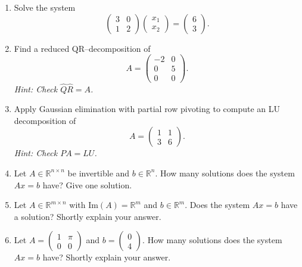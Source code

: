 \vspace*{-0.5cm}
\begin{enumerate}
	
	\item Solve the system
	$$\begin{pmatrix}
	3 & 0\\
	1 & 2
	\end{pmatrix}\begin{pmatrix}
	x_1 \\ x_2
	\end{pmatrix} = \begin{pmatrix}
	6 \\ 3
	\end{pmatrix}.  $$
	\item Find a reduced QR--decomposition of 
		$$A = \begin{pmatrix}
	-2 & 0\\
	0 & 5 \\
	0 & 0
	\end{pmatrix} .$$
	\textit{Hint: Check $\widehat{Q}\widehat{R} = A$.}
	\item Apply Gaussian elimination with partial row pivoting to compute an LU decomposition of 
	$$A = \begin{pmatrix}
	1 & 1\\
	3 & 6
	\end{pmatrix} .$$
	\textit{Hint: Check $PA=LU$.}
	\item Let $A \in \mathbb{R}^{n \times n}$ be invertible and $b \in \mathbb{R}^n$. How many solutions does the system $Ax=b$ have? Give one solution.
	\item Let $A \in \mathbb{R}^{m \times n}$ with $\text{Im}(A)=\mathbb{R}^m$ and $b \in \mathbb{R}^m$. Does the system $Ax=b$ have a solution? Shortly explain your answer.
	\item Let $A = \begin{pmatrix}
	1 & \pi\\
	0 & 0
	\end{pmatrix}$ and $b = \begin{pmatrix}
	0\\4
	\end{pmatrix}$. How many solutions does the system $Ax=b$ have? Shortly explain your answer.
	
\end{enumerate}
 